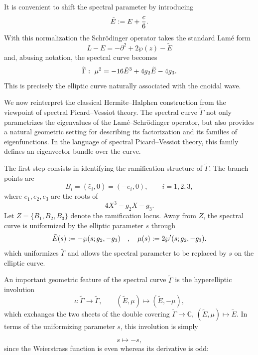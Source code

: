 \documentclass[a4paper,12pt]{article}
\begin{document}
It is convenient to shift the spectral parameter by introducing
\[
\Tilde{E} :=E+\dfrac c6 .
\]
With this normalization the Schr\"odinger operator takes the standard Lam\'e form
\begin{equation}\label{ecu-Lame}
   L-E=   -\partial^2 +2\wp(z) - \widetilde{E}  
\end{equation}
and, abusing notation, the spectral curve becomes
\begin{equation}\label{eq:cnsp}
\widetilde{\Gamma}: \ \mu^2=-16\Tilde{E}^3+4g_2 \widetilde{E}-4g_3 . 
\end{equation}
This is precisely the elliptic curve naturally associated with the cnoidal wave.




We now reinterpret the classical Hermite–Halphen construction from the
viewpoint of spectral Picard–Vessiot theory. The spectral curve
$\widetilde{\Gamma}$ not only parametrizes the eigenvalues of the
Lam\'e–Schr\"odinger operator, but also provides a natural geometric setting
for describing its factorization and its families of eigenfunctions. In the language of spectral Picard–Vessiot theory, this family defines an eigenvector bundle over the curve.

The first step consists in identifying the ramification structure of $\widetilde{\Gamma}$. The branch points are
\[
B_i=(\widetilde{ e_i },0)=(-e_i,0),
\qquad i=1,2,3,
\]
where $e_1, e_2 , e_3$ are the roots of
\[
4X^3 - g_2 X - g_3.
\]
Let \(Z=\{B_1,B_2,B_3\}\) denote the ramification locus.
Away from \(Z\), the spectral curve is uniformized by the elliptic
parameter \(s\) through 
\begin{equation*}
  \Tilde{E}(s):= - \wp (s; g_2 , - g_3 ) \quad , \quad   \mu(s):= 2 \wp' (s; g_2 , -g_3 ).
\end{equation*}
which uniformizes $\widetilde{\Gamma}$ and allows the spectral parameter to be replaced by $s$ on the elliptic curve.

An important geometric feature of the spectral curve
\(\widetilde{\Gamma}\) is the hyperelliptic involution
\[
\iota:\widetilde{\Gamma}\longrightarrow\widetilde{\Gamma},
\qquad
(\widetilde E,\mu)\longmapsto(\widetilde E,-\mu),
\]
which exchanges the two sheets of the double covering
\(\widetilde{\Gamma}\to\mathbb C\),
\((\widetilde E,\mu)\mapsto \widetilde E\).
In terms of the uniformizing parameter \(s\), this involution is simply

\[
s\longmapsto -s,
\]
since the Weierstrass function is even whereas its derivative is odd:
\end{document}
